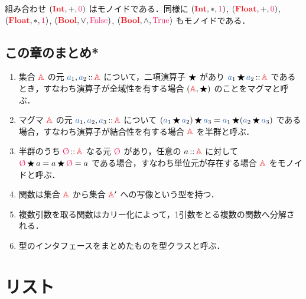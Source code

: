 \documentclass[a5paper,twoside,fleqn,draft]{jsbook}
\begin{document}
組み合わせ $(\hInt,+,\hConstant{0})$ はモノイドである．同様に $(\hInt,*,\hConstant{1})$, $(\hFloat,+,\hConstant{0})$, $(\hFloat,*,\hConstant{1})$, $(\hBool,\hLogicalOr,\hFalse)$, $(\hBool,\hLogicalAnd,\hTrue)$ もモノイドである．


\section{この章のまとめ*}

\begin{enumerate}
\item 集合 $\hSet{A}$ の元 $\hVar{a}_1,\hVar{a}_2\hIsTypeOf\hSet{A}$ について，二項演算子 $\operatorname{\bigstar}$ があり $\hVar{a}_1\hAnyBinOp \hVar{a}_2\hIsTypeOf\hSet{A}$ であるとき，すなわち演算子が全域性を有する場合 $(\hSet{A},\hAnyBinOp)$ のことをマグマと呼ぶ．
\item マグマ $\hSet{A}$ の元 $\hVar{a}_1,\hVar{a}_2,\hVar{a}_3\hIsTypeOf\hSet{A}$ について $(\hVar{a}_1\hAnyBinOp \hVar{a}_2)\hAnyBinOp \hVar{a}_3=\hVar{a}_1\hAnyBinOp(\hVar{a}_2\hAnyBinOp \hVar{a}_3)$ である場合，すなわち演算子が結合性を有する場合 $\hSet{A}$ を半群と呼ぶ．
\item 半群のうち $\mZero\hIsTypeOf\hSet{A}$ なる元 $\mZero$ があり，任意の $a\hIsTypeOf\hSet{A}$ に対して $\mZero\hAnyBinOp a=a\hAnyBinOp\mZero=a$ である場合，すなわち単位元が存在する場合 $\hSet{A}$ をモノイドと呼ぶ．
\item 関数は集合 $\hSet{A}$ から集合 $\hSet{A}'$ への写像という型を持つ．
\item 複数引数を取る関数はカリー化によって，1引数をとる複数の関数へ分解される．
\item 型のインタフェースをまとめたものを型クラスと呼ぶ．
\end{enumerate}

\chapter{リスト}
\label{ch:list}
\end{document}
